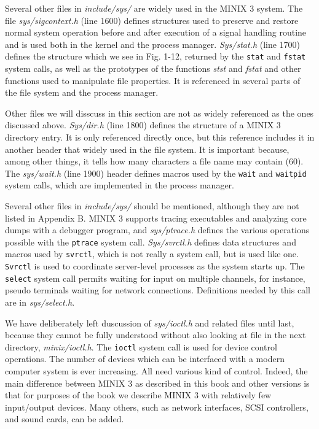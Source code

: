 \documentclass{book}
\newcommand {\sys} [1] {\textsl{#1}}
\newcommand {\cmd} [1] {\texttt{#1}}
\begin{document}
Several other files in \sys{include/sys/} are widely used in the MINIX 3 system.
The file \sys{sys/sigcontext.h} (line 1600) defines structures 
used to preserve and restore normal system operation before and after execution of a signal handling routine 
and is used both in the kernel and the process manager.
\sys{Sys/stat.h} (line 1700) defines the structure which we see in Fig. 1-12,
returned by the \cmd{stat} and \cmd{fstat} system calls,
as well as the prototypes of the functions \sys{stst} and \sys{fstat} 
and other functions used to manipulate file properties.
It is referenced in several parts of the file system and the process manager.

Other files we will disscuss in this section are not as widely referenced as the ones discussed above.
\sys{Sys/dir.h} (line 1800) defines the structure of a MINIX 3 directory entry.
It is only referenced directly once, but this reference includes it in another header that widely used in the file system.
It is important because, among other things, it tells how many characters a file name may contain (60).
The \sys{sys/wait.h} (line 1900) header defines macros used by the \cmd{wait} and \cmd{waitpid} system calls,
which are implemented in the process manager.

Several other files in \sys{include/sys/} should be mentioned, although they are not listed in Appendix B.
MINIX 3 supports tracing executables and analyzing core dumps with a debugger program,
and \sys{sys/ptrace.h} defines the various operations possible with the \cmd{ptrace} system call.
\sys{Sys/svrctl.h} defines data structures and macros used by \cmd{svrctl},
which is not really a system call, but is used like one.
\cmd{Svrctl} is used to coordinate server-level processes as the system starts up.
The \cmd{select} system call permits waiting for input on multiple channels,
for instance, pseudo terminals waiting for network connections.
Definitions needed by this call are in \sys{sys/select.h}.

We have deliberately left duscussion of \sys{sys/ioctl.h} and related files until last,
because they cannot be fully understood without also looking at file in the next directory, \sys{minix/ioctl.h}.
The \cmd{ioctl} system call is used for device control operations.
The number of devices which can be interfaced with a modern computer system is ever increasing.
All need various kind of control.
Indeed, the main difference between MINIX 3 as described in this book and other versions is that
for purposes of the book we describe MINIX 3 with relatively few input/output devices.
Many others, such as network interfaces, SCSI controllers, and sound cards, can be added.
\end{document}
